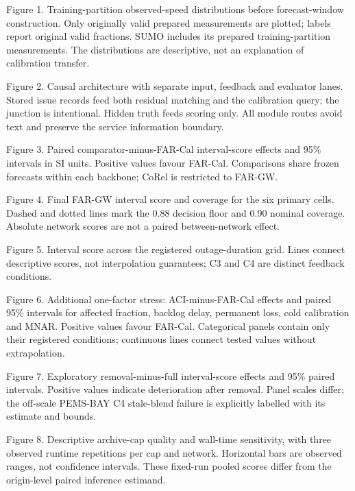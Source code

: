 Figure 1. Training-partition observed-speed distributions before forecast-window construction. Only originally valid prepared measurements are plotted; labels report original valid fractions. SUMO includes its prepared training-partition measurements. The distributions are descriptive, not an explanation of calibration transfer.

Figure 2. Causal architecture with separate input, feedback and evaluator lanes. Stored issue records feed both residual matching and the calibration query; the junction is intentional. Hidden truth feeds scoring only. All module routes avoid text and preserve the service information boundary.

Figure 3. Paired comparator-minus-FAR-Cal interval-score effects and 95\% intervals in SI units. Positive values favour FAR-Cal. Comparisons share frozen forecasts within each backbone; CoRel is restricted to FAR-GW.

Figure 4. Final FAR-GW interval score and coverage for the six primary cells. Dashed and dotted lines mark the 0.88 decision floor and 0.90 nominal coverage. Absolute network scores are not a paired between-network effect.

Figure 5. Interval score across the registered outage-duration grid. Lines connect descriptive scores, not interpolation guarantees; C3 and C4 are distinct feedback conditions.

Figure 6. Additional one-factor stress: ACI-minus-FAR-Cal effects and paired 95\% intervals for affected fraction, backlog delay, permanent loss, cold calibration and MNAR. Positive values favour FAR-Cal. Categorical panels contain only their registered conditions; continuous lines connect tested values without extrapolation.

Figure 7. Exploratory removal-minus-full interval-score effects and 95\% paired intervals. Positive values indicate deterioration after removal. Panel scales differ; the off-scale PEMS-BAY C4 stale-blend failure is explicitly labelled with its estimate and bounds.

Figure 8. Descriptive archive-cap quality and wall-time sensitivity, with three observed runtime repetitions per cap and network. Horizontal bars are observed ranges, not confidence intervals. These fixed-run pooled scores differ from the origin-level paired inference estimand.